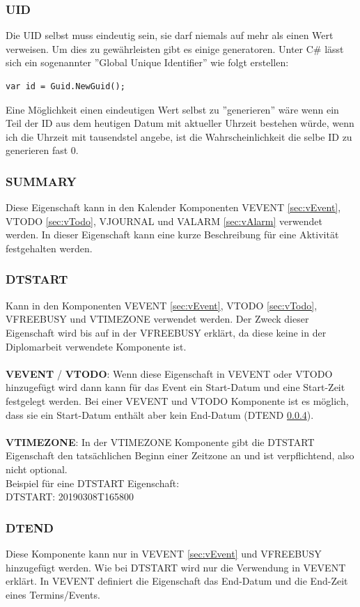 \subsubsection{UID}
\label{sec:uid}
Die UID selbst muss eindeutig sein, sie darf niemals auf mehr als einen Wert verweisen. Um dies zu gewährleisten gibt es einige generatoren. Unter C\# lässt sich ein sogenannter ''Global Unique Identifier'' wie folgt erstellen: \\
\begin{lstlisting}[caption=GUID in C\#, label=lst:test]
var id = Guid.NewGuid(); 
\end{lstlisting}
Eine Möglichkeit einen eindeutigen Wert selbst zu ''generieren'' wäre wenn ein Teil der ID aus dem heutigen Datum mit aktueller Uhrzeit bestehen würde, wenn ich die Uhrzeit mit tausendstel angebe, ist die Wahrscheinlichkeit die selbe ID zu generieren fast 0.
\subsubsection{SUMMARY}
\label{sec:summary}
Diese Eigenschaft kann in den Kalender Komponenten VEVENT \ref{sec:vEvent}, VTODO \ref{sec:vTodo}, VJOURNAL und VALARM \ref{sec:vAlarm} verwendet werden. In dieser Eigenschaft kann eine kurze Beschreibung für eine Aktivität festgehalten werden.
\subsubsection{DTSTART}
\label{sec:dtstart}
Kann in den Komponenten VEVENT \ref{sec:vEvent}, VTODO \ref{sec:vTodo}, VFREEBUSY und VTIMEZONE verwendet werden. Der Zweck dieser Eigenschaft wird bis auf in der VFREEBUSY erklärt, da diese keine in der Diplomarbeit verwendete Komponente ist. \\ \\ \textbf{VEVENT} / \textbf{VTODO}: Wenn diese Eigenschaft in VEVENT oder VTODO hinzugefügt wird dann kann für das Event ein Start-Datum und eine Start-Zeit festgelegt werden. Bei einer VEVENT und VTODO Komponente ist es möglich, dass sie ein Start-Datum enthält aber kein End-Datum (DTEND \ref{sec:dtend}). \\ \\ \textbf{VTIMEZONE}: In der VTIMEZONE Komponente gibt die DTSTART Eigenschaft den tatsächlichen Beginn einer Zeitzone an und ist verpflichtend, also nicht optional. \\
Beispiel für eine DTSTART Eigenschaft: \\
DTSTART: 20190308T165800 
\subsubsection{DTEND}
\label{sec:dtend}
Diese Komponente kann nur in VEVENT \ref{sec:vEvent} und VFREEBUSY hinzugefügt werden. Wie bei DTSTART wird nur die Verwendung in VEVENT erklärt. In VEVENT definiert die Eigenschaft das End-Datum und die End-Zeit eines Termins/Events.
